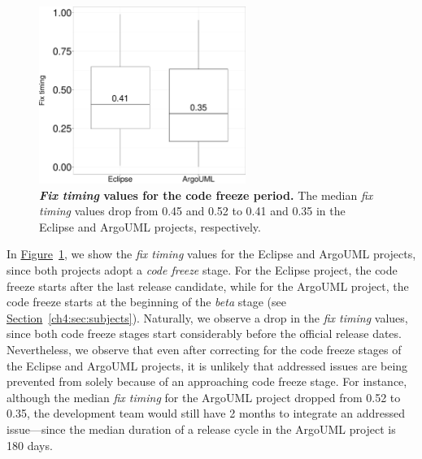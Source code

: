 \begin{figure} \center \includegraphics[width=0.60\textwidth,keepaspectratio]
	{chapters/chapter4/figures/as_codefreeze.pdf} \caption{\textbf{{\em Fix timing} values for
		the code freeze period.} The median {\em fix timing} values drop
		from 0.45 and 0.52 to 0.41 and 0.35 in the Eclipse and ArgoUML
projects, respectively. } \label{ch4:fig:codefreeze_allsystems} \end{figure}

In \hyperref[ch4:fig:codefreeze_allsystems]{Figure}~\ref{ch4:fig:codefreeze_allsystems},
we show the {\em fix timing} values for the Eclipse and ArgoUML projects, since
both projects adopt a {\em code freeze} stage. For the Eclipse project, the code
freeze starts after the last release candidate, while for the ArgoUML project,
the code freeze starts at the beginning of the {\em beta} stage (see
\hyperref[ch4:sec:subjects]{Section}~\ref{ch4:sec:subjects}). Naturally, we observe a
drop in the {\em fix timing} values, since both code freeze stages start considerably
before the official release dates. Nevertheless, we observe that even after correcting for
the code freeze stages of the Eclipse and ArgoUML projects, it is unlikely
that addressed issues are being prevented from \DIFdelbegin {}\DIFdelend \DIFaddbegin {}\DIFaddend solely because of an approaching code
freeze stage. For instance, although the median {\em fix timing} for the ArgoUML project
dropped from 0.52 to 0.35, the development team would still have 2 months to
integrate an addressed issue---since the median duration of a release cycle in the
ArgoUML project is 180 days.

\DIFdelbegin %
\DIFdelend \DIFaddbegin {}
\DIFaddend 

